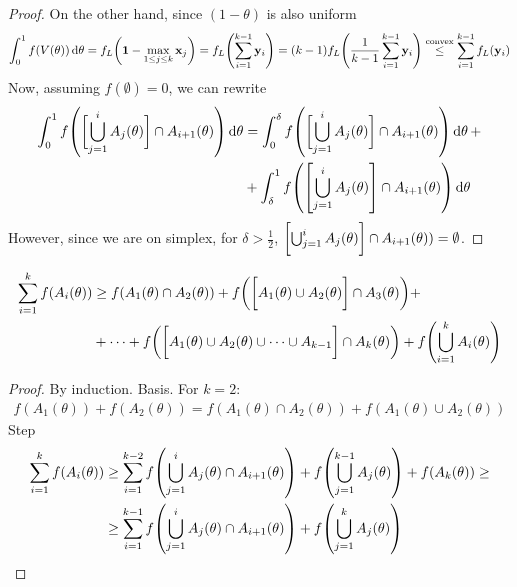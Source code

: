 \begin{lemma}
\begin{proof}
		On the other hand, since $(1-\theta)$ is also uniform 
		\begin{align}
		\int_{0}^1 f(V(\theta)) \dd{\theta}= f_L\qty(\vb{1} - \max\limits_{1\leq j \leq k} \vb{x}_j) = f_L\qty(\sum_{i=1}^{k-1} \vb{y}_i)= (k-1)f_L\qty(\frac{1}{k-1}\sum_{i=1}^{k-1} \vb{y}_i) \stackrel{\text{convex}}{\leq} \sum_{i=1}^{k-1}f_L\qty( \vb{y}_i)
		\end{align}
		Now, assuming $f(\emptyset) = 0$, we can rewrite
		\begin{align}
		\int_0^1 f\qty(\qty\bigg[ \bigcup_{j=1}^{i} A_j(\theta)] \cap A_{i+1}(\theta)) \dd{\theta} &= \int_0^\delta f\qty(\qty\bigg[ \bigcup_{j=1}^{i} A_j(\theta)] \cap A_{i+1}(\theta)) \dd{\theta} +\\&+ \int_\delta^1 f\qty(\qty[ \bigcup_{j=1}^{i} A_j(\theta)] \cap A_{i+1}(\theta)) \dd{\theta}
		\end{align}
		However, since we are on simplex, for $\delta>\frac{1}{2}$, $\qty\bigg[ \bigcup_{j=1}^{i} A_j(\theta)] \cap A_{i+1}(\theta)) =\emptyset$.
	\end{proof}
\end{lemma}
\begin{lemma}\label{th:delta_lemma2}
	\begin{align}
	\sum_{i=1}^k f(A_i(\theta)) &\geq f(A_1(\theta) \cap A_2(\theta)) + f\qty(\qty\bigg[A_1(\theta) \cup A_2(\theta)] \cap A_3(\theta)) +\\&+ \dots + f\qty(\qty\bigg[A_1(\theta) \cup A_2(\theta) \cup \dots \cup A_{k-1}] \cap A_k(\theta)) + f\qty(\bigcup_{i=1}^k A_i(\theta) ) 
	\end{align}
	\begin{proof}
		By induction. Basis. For $k=2$:
		\begin{align}
		f(A_1(\theta))+f(A_2(\theta)) = f(A_1(\theta) \cap A_2(\theta)) +f(A_1(\theta) \cup A_2(\theta)) 
		\end{align}
		Step
		\begin{align}
			\sum_{i=1}^k f(A_i(\theta)) &\geq \sum_{i=1}^{k-2} f\qty(\bigcup_{j=1}^i A_j(\theta) \cap A_{i+1}(\theta)) + f\qty(\bigcup_{j=1}^{k-1} A_{j}(\theta)) + f(A_k(\theta)) \geq\\&\geq  \sum_{i=1}^{k-1} f\qty(\bigcup_{j=1}^i A_j(\theta) \cap A_{i+1}(\theta))+ f\qty(\bigcup_{j=1}^{k} A_{j}(\theta))  
		\end{align}
	\end{proof}
\end{lemma}
